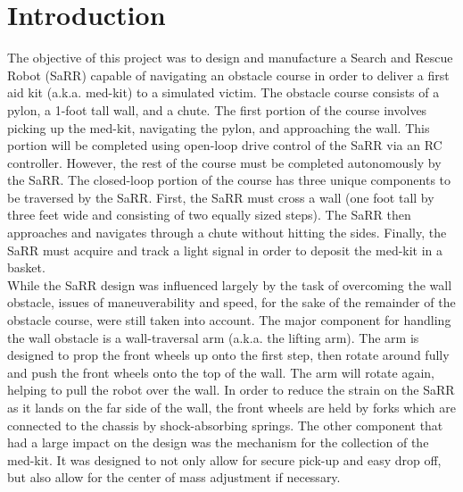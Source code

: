 \documentclass[12pt]{article}
\begin{document}
\tableofcontents
\newpage


\section{Introduction}

The objective of this project was to design and manufacture a Search and Rescue Robot (SaRR) capable of navigating an obstacle course in order to deliver a first aid kit (a.k.a. med-kit) to a simulated victim. The obstacle course consists of a pylon, a 1-foot tall wall, and a chute. The first portion of the course involves picking up the med-kit, navigating the pylon, and approaching the wall. This portion will be completed using open-loop drive control of the SaRR via an RC controller. However, the rest of the course must be completed autonomously by the SaRR. The closed-loop portion of the course has three unique components to be traversed by the SaRR. First, the SaRR must cross a wall (one foot tall by three feet wide and consisting of two equally sized steps). The SaRR then approaches and navigates through a chute without hitting the sides. Finally, the SaRR must acquire and track a light signal in order to deposit the med-kit in a basket. \\

While the SaRR design was influenced largely by the task of overcoming the wall obstacle, issues of maneuverability and speed, for the sake of the remainder of the obstacle course, were still taken into account. The major component for handling the wall obstacle is a wall-traversal arm (a.k.a. the lifting arm). The arm is designed to prop the front wheels up onto the first step, then rotate around fully and push the front wheels onto the top of the wall. The arm will rotate again, helping to pull the robot over the wall. In order to reduce the strain on the SaRR as it lands on the far side of the wall, the front wheels are held by forks which are connected to the chassis by shock-absorbing springs. The other component that had a large impact on the design was the mechanism for the collection of the med-kit. It was designed to not only allow for secure pick-up and easy drop off, but also allow for the center of mass adjustment if necessary.  \\
\end{document}

